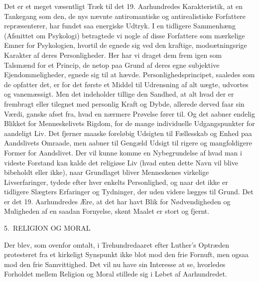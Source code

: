 \documentclass[12pt,a4paper,openany]{book}
\newcommand{\opage}[1]{\marginnote{\footnotesize\textit{[#1]}}}
\newcommand{\chapterhead}[2]{\par\bigskip\phantomsection\begin{center}{\large #1\ #2}\end{center}\addcontentsline{toc}{chapter}{#1 #2}\medskip}
\begin{document}
\opage{142}Det er et meget væsentligt Træk til det 19. Aarhundredes Karakteristik,
at en Tankegang som den, de nys nævnte antiromantiske og
antirealistiske Forfattere repræsenterer, har fundet saa energiske
Udtryk. I en tidligere Sammenhæng (Afsnittet om Psykologi) betragtede
vi nogle af disse Forfattere som mærkelige Emner for Psykologien,
hvortil de egnede sig ved den kraftige, modsætningsrige Karakter
af deres Personligheder. Her har vi draget dem frem igen som
Talsmænd for et Princip, de netop paa Grund af deres egne subjektive
Ejendommeligheder, egnede sig til at hævde. Personlighedsprincipet,
saaledes som de opfatter det, er for det første et Middel til Udrensning
af alt uægte, udvortes og vanemæssigt. Men det indeholder
tillige den Sandhed, at alt hvad der er frembragt eller tilegnet med
personlig Kraft og Dybde, allerede derved faar sin Værdi, ganske
afset fra, hvad en nærmere Prøvelse fører til. Og det aabner endelig
Blikket for Menneskelivets Rigdom, for de mange individuelle Udgangspunkter
for aandeligt Liv. Det fjerner maaske foreløbig Udsigten
til Fællesskab og Enhed paa Aandslivets Omraade, men aabner
til Gengæld Udsigt til rigere og mangfoldigere Former for Aandslivet.
Der vil kunne komme en Nybegrundelse af hvad man i videste
Forstand kan kalde det religiøse Liv (hvad enten dette Navn vil blive
bibeholdt eller ikke), naar Grundlaget bliver Menneskenes virkelige
Livserfaringer, tydede efter hver enkelts Personlighed, og naar det
ikke er tidligere Slægters Erfaringer og Tydninger, der uden videre
lægges til Grund. Det er det 19. Aarhundredes Ære, at det har havt
Blik for Nødvendigheden og Muligheden af en saadan Fornyelse,
skønt Maalet er stort og fjernt.

\chapterhead{5.}{RELIGION OG MORAL}

Der blev, som ovenfor omtalt, i Trehundredaaret efter Luther’s
Optræden protesteret fra et kirkeligt Synspunkt ikke blot mod den
frie Fornuft, men ogsaa mod den frie Samvittighed. Det vil nu have
sin Interesse at se, hvorledes Forholdet mellem Religion og Moral
stillede sig i Løbet af Aarhundredet.
\end{document}
